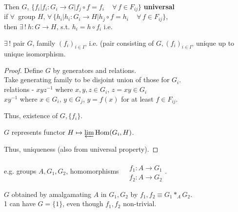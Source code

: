 Then $G$,  $\lbrace f_i | f_i : G_i \to G  |  f_j \circ f = f_i \quad \, \forall \, f \in F_{ij} \rbrace$ \textbf{universal} \\
\phantom{Then } if $\forall \, $ group $H$, $\forall \, \lbrace h_i |  h_i : G_i \to H  | h_j \circ f = h_i \quad \, \forall \, f \in F_{ij} \rbrace$, \\
\phantom{Then if } then $\exists \, ! \  h : G\to H$, s.t. $h_i = h \circ f_i$ i.e. 






\begin{proposition}
	$\exists \, !$ pair $G$, family $(f_i)_{i\in I}$, i.e. (pair consisting of $G, (f_i)_{i\in I}$, unique up to unique isomorphism.  
\end{proposition}
\begin{proof}
Define $G$ by generators and relations.  \\
Take generating family to be disjoint union of those for $G_i$.  \\
relations - $xyz^{-1}$ where $x,y,z \in G_i$, $z=xy \in G_i$ \\
\phantom{relations - } $xy^{-1}$ where $x\in G_i$, $y \in G_j$, $y=f(x)$ for at least $f\in F_{ij}$.  

Thus, existence of $G,\lbrace f_i\rbrace$.  

$G$ represents functor $H\mapsto \varprojlim \text{Hom}{(G_i,H)}$.  

Thus, uniqueness (also from universal property).  
\end{proof}

e.g. groups $A,G_1,G_2$, homomorphisms $\begin{aligned} & \quad \\ 
& f_1 : A \to G_1 \\
& f_2 : A \to G_2 
\end{aligned}$.  

$G$ obtained by amalgamating $A$ in $G_1,G_2$ by $f_1,f_2 \equiv G_1 *_A G_2$.  \\
1 can have $G=\lbrace 1 \rbrace$, even though $f_1,f_2$ non-trivial.  

